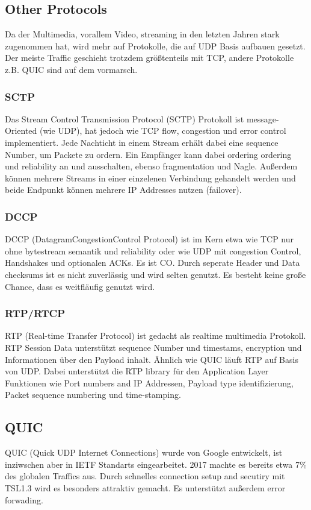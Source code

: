 	\subsection{Other Protocols}
		Da der Multimedia, vorallem Video, streaming in den letzten Jahren stark zugenommen hat, wird mehr auf Protokolle, die auf UDP Basis aufbauen gesetzt. Der meiste Traffic geschieht trotzdem größtenteils mit TCP, andere Protokolle z.B. QUIC sind auf dem vormarsch. 

		\subsubsection{SCTP}
			Das Stream Control Transmission Protocol (SCTP) Protokoll ist message-Oriented (wie UDP), hat jedoch wie TCP flow, congestion und error control implementiert. Jede Nachticht in einem Stream erhält dabei eine sequence Number, um Packete zu ordern. Ein Empfänger kann dabei ordering ordering und reliability an und ausschalten, ebenso fragmentation und Nagle. Außerdem können mehrere Streams in einer einzelenen Verbindung gehandelt werden und beide Endpunkt können mehrere IP Addresses nutzen (failover).
		
		\subsubsection{DCCP}
			DCCP (DatagramCongestionControl Protocol) ist im Kern etwa wie TCP nur ohne bytestream semantik und reliability oder wie UDP mit congestion Control, Handshakes und optionalen ACKs. Es ist CO. Durch seperate Header und Data checksums ist es nicht zuverlässig und wird selten genutzt. Es besteht keine große Chance, dass es weitfläufig genutzt wird.
		
		\subsubsection{RTP/RTCP}
			RTP (Real-time Transfer Protocol) ist gedacht als realtime multimedia Protokoll. RTP Session Data unterstützt sequence Number und timestams, encryption und Informationen über den Payload inhalt. Ähnlich wie QUIC läuft RTP auf Basis von UDP. Dabei unterstützt die RTP library für den Application Layer Funktionen wie Port numbers and IP Addressen, Payload type identifizierung, Packet sequence numbering und time-stamping. 
		
		\subsection{QUIC}
			QUIC (Quick UDP Internet Connections) wurde von Google entwickelt, ist inziwschen aber in IETF Standarts eingearbeitet. 2017 machte es bereits etwa 7\% des globalen Traffics aus. Durch schnelles connection setup and secutiry mit TSL1.3 wird es besonders attraktiv gemacht. Es unterstützt außerdem error forwading.